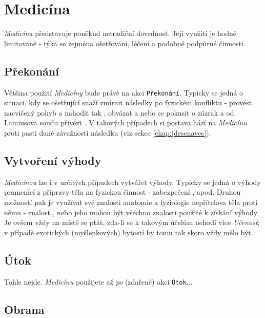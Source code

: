 \documentclass[../main.tex]{subfiles}
\begin{document}
\section{Medicína}
\label{sec:medicina}

\textit{Medicína} představuje poněkud netradiční dovednost. Její využití je hodně limitované - týká se zejména ošetřování, léčení a podobné podpůrné činnosti. 

\subsection*{Překonání}
\label{subsec:medicina-prekonani}
\prekonani

Většina použití \textit{Medicíny} bude právě na akci \texttt{Překonání}. Typicky se jedná o situaci, kdy se ošetřující snaží zmírnit následky po fyzickém konfliktu - provést nacvičený pohyb a nahodit tak  , obvázat  a nebo se pokusit o zázrak a od Lamiusova soudu přivézt . V takových případech si postava hází na \textit{Medicínu} proti pasti dané závažnosti následku (viz sekce \ref{chap:jdesenavec}).


\subsection*{Vytvoření výhody}
\label{subsec:medicina-vytvoreni}
\vytvoreni

\textit{Medicínou} lze i v určitých případech vytvářet výhody. Typicky se jedná o výhody pramenící z přípravy těla na fyzickou činnost - zabezpečení ,  apod. Druhou možností pak je využívat své znalosti anatomie a fyziologie nepřítelova těla proti němu - znalost ,  nebo jeho  mohou být všechno znalosti použité k získání výhody. Je ovšem vždy na místě se ptát, zda-li se k takovým účelům nehodí více \textit{Učenost}; v případě exotických (myšlenkových) bytostí by tomu tak skoro vždy mělo být.

\subsection*{Útok}
\label{subsec:medicina-utok}
\utok

Tohle nejde. \textit{Medicínu} použijete až \textit{po} (zdařené) akci \texttt{Útok}...

\subsection*{Obrana}
\label{subsec:medicina-obrana}
\obrana
\end{document}
